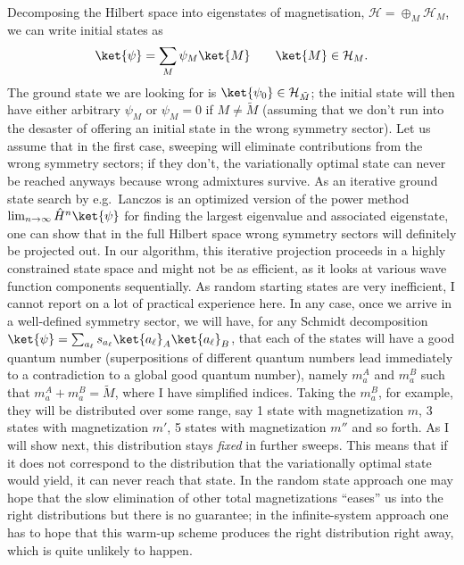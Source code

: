 Decomposing the Hilbert space into eigenstates of magnetisation, ${\mathcal H} = \oplus_M {\mathcal H}_M$, we can write initial states as 
\begin{equation}
\ket{\psi} = \sum_M \psi_M \ket{M} \quad\quad \ket{M} \in {\mathcal H}_M .
\end{equation}
The ground state we are looking for is $\ket{\psi_0} \in {\mathcal H}_{\tilde{M}}$; the initial state will then have either arbitrary $\psi_M$ or $\psi_M = 0$ if $M \neq \tilde{M}$ (assuming that we don't run into the desaster of offering an initial state in the wrong symmetry sector). Let us assume that in the first case, sweeping will eliminate contributions from the wrong symmetry sectors; if they don't, the variationally optimal state can never be reached anyways because wrong admixtures survive. As an iterative ground state search by e.g.\  Lanczos is an optimized version of the power method $\lim_{n\rightarrow\infty} \hat{H}^n \ket{\psi}$ for finding the largest eigenvalue and associated eigenstate, one can show that in the full Hilbert space wrong symmetry sectors will definitely be projected out.  In our algorithm, this iterative projection proceeds in a highly constrained state space and might not be as efficient, as it looks at various wave function components sequentially. As random starting states are very inefficient, I cannot report on a lot of practical experience here.
In any case, once we arrive in a well-defined symmetry sector, we will have, for any Schmidt decomposition $\ket{\psi} = \sum_{a_\ell} s_{a_\ell} \ket{a_\ell}_A \ket{a_\ell}_B$, that each of the states will have a good quantum number (superpositions of different quantum numbers lead immediately to a contradiction to a global good quantum number), namely $m_a^A$ and $m_a^B$ such that $m_a^A + m_a^B = \tilde{M}$, where I have simplified indices. Taking the $m_a^B$, for example, they will be distributed over some range, say 1 state with magnetization $m$, 3 states with magnetization $m'$, 5 states with magnetization $m''$ and so forth. As I will show next, this distribution stays {\em fixed} in further sweeps. This means that if it does not correspond to the distribution that the variationally optimal state would yield, it can never reach that state. In the random state approach one may hope that the slow elimination of other total magnetizations ``eases'' us into the right distributions but there is no guarantee; in the infinite-system approach one has to hope that this warm-up scheme produces the right distribution right away, which is quite unlikely to happen. 

